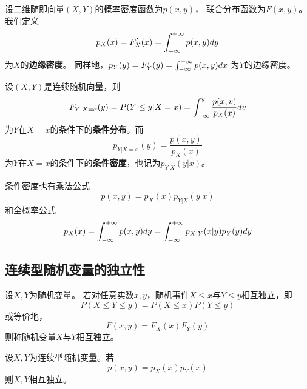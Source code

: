 \begin{definition}[边缘密度]
  设二维随即向量$(X,Y)$的概率密度函数为$p(x,y)$，
  联合分布函数为$F(x,y)$。
  我们定义
  \begin{displaymath}
    p_X(x)=F'_X(x) = \int_{-\infty}^{+\infty} p(x,y)dy
  \end{displaymath}
  为$X$的\textbf{边缘密度}。
  同样地，$p_Y(y)=F'_Y(y) = \int_{-\infty}^{+\infty} p(x,y)dx$
  为$Y$的边缘密度。
\end{definition}

\begin{definition}[二维连续型随机变量的条件密度]
  设$(X,Y)$是连续随机向量，则
  \begin{displaymath}
    F_{Y|X=x}(y)=P(Y\le y|X = x)=
      \int_{-\infty}^{y}\frac{p(x,v)}{p_X(x)}dv
  \end{displaymath}
  为$Y$在$X=x$的条件下的\textbf{条件分布}。而
  \begin{displaymath}
    p_{Y|X=x}(y)=\frac{p(x,y)}{p_X(x)}
  \end{displaymath}
  为$Y$在$X=x$的条件下的\textbf{条件密度}，也记为$p_{Y|X}(y|x)$。
\end{definition}

\begin{theorem}[条件密度的两个公式]
  条件密度也有乘法公式
  \begin{displaymath}
    p(x,y) = p_X(x)p_{Y|X}(y|x)
  \end{displaymath}
  和全概率公式
  \begin{displaymath}
    p_X(x) = \int_{-\infty}^{+\infty} p(x,y)dy
    = \int_{-\infty}^{+\infty} p_{X|Y}(x|y)p_Y(y)dy
  \end{displaymath}
\end{theorem}

\subsection{连续型随机变量的独立性}
\begin{definition}[两个随机变量的独立性]
  设$X,Y$为随机变量。
  若对任意实数$x,y$，随机事件$X\le x$与$Y\le y$相互独立，即
  \begin{displaymath}
    P(X\le Y\le y)=P(X\le x)P(Y\le y)
  \end{displaymath}
  或等价地，
  \begin{displaymath}
    F(x,y)=F_X(x)F_Y(y)
  \end{displaymath}
  则称随机变量$X$与$Y$相互独立。
\end{definition}

\begin{theorem}[两个连续型随机变量相互独立的条件]
  设$X,Y$为连续型随机变量。若
  \begin{displaymath}
    p(x,y)=p_X(x)p_Y(x)
  \end{displaymath}
  则$X,Y$相互独立。
\end{theorem}

